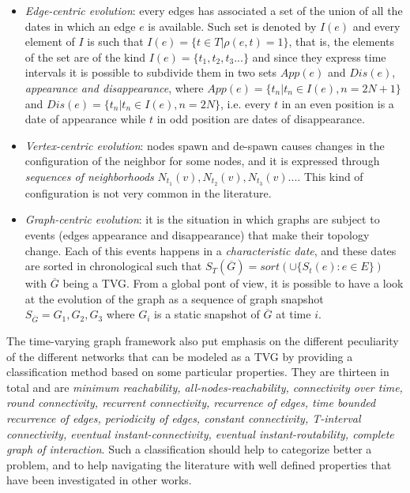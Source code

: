 	\begin{itemize}
		\item \textit{Edge-centric evolution}: every edges has associated a set of the union of all the dates in which an edge \(e\) is available. Such set is denoted by \(I(e)\) and every element of \(I\) is such that \(I(e) = \{t \in T | \rho(e,t) = 1\}\), that is, the elements of the set are of the kind \(I(e) = \{t_1, t_2, t_3 ... \}\) and since they express time intervals it is possible to subdivide them in two sets \(App(e)\) and \(Dis(e)\), \textit{appearance and disappearance}, where \(App(e) = \{t_n | t_n \in I(e), n = 2N + 1\}\) and \(Dis(e) = \{t_n | t_n \in I(e), n = 2N\}\), i.e. every \(t\) in an even position is a date of appearance while \(t\) in odd position are dates of disappearance.
		
		\item \textit{Vertex-centric evolution}: nodes spawn and de-spawn causes changes in the configuration of the neighbor for some nodes, and it is expressed through \textit{sequences of neighborhoods} \(N_{t_1}(v), N_{t_2}(v), N_{t_3}(v) ...\). This kind of configuration is not very common in the literature.
		
		\item \textit{Graph-centric evolution}: it is the situation in which graphs are subject to events (edges appearance and disappearance) that make their topology change. Each of this events happens in a \textit{characteristic date}, and these dates are sorted in chronological such that \(S_{T}(\overline{G}) = sort(\cup\{S_t(e) : e \in E\})\) with \( \overline{G}\) being a TVG. From a global pont of view, it is possible to have a look at the evolution of the graph as a sequence of graph snapshot \(S_{\overline{G}} = G_1, G_2, G_3\) where \(G_i\) is a static snapshot of \(\overline{G}\) at time \(i\).
	\end{itemize}
	
	The time-varying graph framework also put emphasis on the different peculiarity of the different networks that can be modeled as a TVG by providing a classification method based on some particular properties. They are thirteen in total and are \textit{minimum reachability, all-nodes-reachability, connectivity over time, round connectivity, recurrent connectivity, recurrence of edges, time bounded recurrence of edges, periodicity of edges, constant connectivity, T-interval connectivity, eventual instant-connectivity, eventual instant-routability, complete graph of interaction}.
	Such a classification should help to categorize better a problem, and to help navigating the literature with well defined properties that have been investigated in other works.

